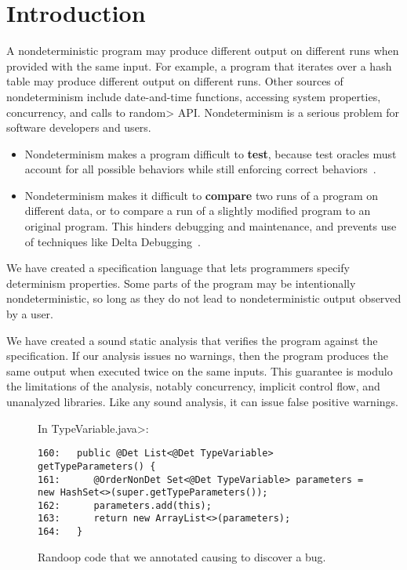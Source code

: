 \section{Introduction\label{sec:introduction}}

A nondeterministic program may produce different output on different runs
when provided with the same input.
For example, a program that iterates over a hash table
may produce different output on different runs.
Other sources of nondeterminism include
date-and-time functions,
accessing system properties,
concurrency,
and calls to \<random> API.
%
Nondeterminism is a serious problem for software developers and users.
\begin{itemize}
\item
  Nondeterminism makes a program difficult to \textbf{test}, because test
  oracles must account for all possible behaviors while still enforcing
  correct behaviors~\cite{LuoHEM2014,ShiGLM2016,BellLHEYM2018,Sudarshan}.
\item
  Nondeterminism makes it difficult to \textbf{compare} two runs of a
  program on different data, or to compare a run of a slightly modified
  program to an original program.  This hinders debugging and maintenance,
  and prevents use of techniques like Delta Debugging~\cite{Zeller1999,YuLCZ2012}.
\end{itemize}


We have created a specification language that lets programmers specify
determinism properties.
Some parts of the program may be intentionally nondeterministic, so long
as they do not lead to nondeterministic output observed by a user.  

We have created a sound static analysis that verifies the program against the specification.
If our analysis issues no warnings, then the program produces the same
output when executed twice on the same inputs.  This guarantee is modulo
the limitations of the
analysis, notably 
concurrency, implicit control flow, and unanalyzed libraries.
Like any
sound analysis, it can issue false positive warnings.

\begin{figure*}

\noindent
In \<TypeVariable.java>:

\begin{Verbatim}
160:   public @Det List<@Det TypeVariable> getTypeParameters() {
161:      @OrderNonDet Set<@Det TypeVariable> parameters = new HashSet<>(super.getTypeParameters());
162:      parameters.add(this);
163:      return new ArrayList<>(parameters);
164:   }
\end{Verbatim}

\caption{Randoop code that we annotated causing \theDeterminismChecker to discover a bug.}
\label{fig:randoop-bug-hashset}
\end{figure*}


